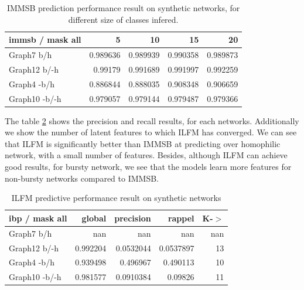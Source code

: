 \begin{table} \label{table:immsb}
\begin{tabular}{lrrrr}
\hline                                                                             
 immsb / mask all   &        5 &       10 &       15 &       20 \\                 
\hline                                                                             
 Graph7 b/h         & 0.989636 & 0.989939 & 0.990358 & 0.989873 \\                 
 Graph12 b/-h       & 0.99179  & 0.991689 & 0.991997 & 0.992259 \\                 
 Graph4 -b/h        & 0.886844 & 0.888035 & 0.908348 & 0.906659 \\                 
 Graph10 -b/-h      & 0.979057 & 0.979144 & 0.979487 & 0.979366 \\                 
\hline                                                                             
\end{tabular}  
    \caption{IMMSB prediction performance result on synthetic networks, for different size of classes infered.}
\end{table}


The table \ref{table:ibp} shows the precision and recall results, for each networks. Additionally we show the number of latent features to which ILFM has converged. We can see that ILFM is significantly better than IMMSB at predicting over homophilic network, with a small number of features. Besides, although ILFM can achieve good results, for bursty network, we see that the models learn more features for non-bursty networks compared to IMMSB. 

\begin{table} \label{table:ibp}
\begin{tabular}{lrrrr}
\hline
 ibp / mask all   &     global &   precision &      rappel &   K-\ensuremath{>} \\
\hline
 Graph7 b/h       & nan        & nan         & nan         &   nan \\
 Graph12 b/-h     &   0.992204 &   0.0532044 &   0.0537897 &    13 \\
 Graph4 -b/h      &   0.939498 &   0.496967  &   0.490113  &    10 \\
 Graph10 -b/-h    &   0.981577 &   0.0910384 &   0.09826   &    11 \\
\hline
\end{tabular}  
    \caption{ILFM predictive performance result on synthetic networks}
\end{table}

